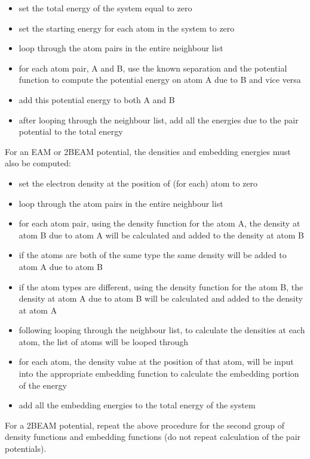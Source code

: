 \documentclass[12pt,twoside]{manual}
\begin{document}
\begin{itemize}
\item set the total energy of the system equal to zero
\item set the starting energy for each atom in the system to zero
\item loop through the atom pairs in the entire neighbour list
\item for each atom pair, A and B, use the known separation and the potential function to compute the potential energy on atom A due to B and vice versa
\item add this potential energy to both A and B
\item after looping through the neighbour list, add all the energies due to the pair potential to the total energy
\end{itemize}

For an EAM or 2BEAM potential, the densities and embedding energies must also be computed:

\begin{itemize}
\item set the electron density at the position of (for each) atom to zero
\item loop through the atom pairs in the entire neighbour list
\item for each atom pair, using the density function for the atom A, the density at atom B due to atom A will be calculated and added to the density at atom B
\item if the atoms are both of the same type the same density will be added to atom A due to atom B
\item if the atom types are different, using the density function for the atom B, the density at atom A due to atom B will be calculated and added to the density at atom A
\item following looping through the neighbour list, to calculate the densities at each atom, the list of atoms will be looped through
\item for each atom, the density value at the position of that atom, will be input into the appropriate embedding function to calculate the embedding portion of the energy
\item add all the embedding energies to the total energy of the system
\end{itemize}

For a 2BEAM potential, repeat the above procedure for the second group of density functions and embedding functions (do not repeat calculation of the pair potentials).
\end{document}
